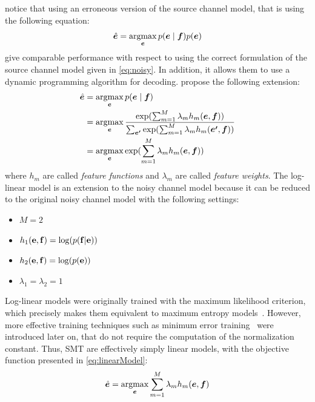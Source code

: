 
\citet{och-tillmann-ney:1999:EMNLP} notice that using an erroneous
version of the source channel model, that is using the following equation:
%
\begin{equation}
  \hat{\bm{e}} = \operatorname*{argmax}_{\bm{e}} p(\bm{e} \mid \bm{f}) p(\bm{e})
\end{equation}
%
give comparable performance with respect to using the correct
formulation of the source channel model given in \autoref{eq:noisy}. In addition, it
allows them to use a dynamic programming algorithm for decoding.
\citet{och-ney:2002:ACL} propose the following extension:
%
\begin{align}
  \hat{\bm{e}} &= \operatorname*{argmax}_{\bm{e}} p(\bm{e} \mid \bm{f}) \nonumber \\
               &= \operatorname*{argmax}_{\bm{e}} \frac{\exp(\sum_{m=1}^M \lambda_m h_m(\bm{e}, \bm{f}))}{\sum_{\bm{e'}}\exp(\sum_{m=1}^M \lambda_m h_m(\bm{e'}, \bm{f}))} \nonumber \\
               &= \operatorname*{argmax}_{\bm{e}} \exp(\sum_{m=1}^M \lambda_m h_m(\bm{e}, \bm{f})) \label{eq:loglinearModel}
\end{align}
%
where $h_m$ are called \emph{feature functions} and $\lambda_m$
are called \emph{feature weights}. The log-linear model is an extension
to the noisy channel model because it can be reduced to the original
noisy channel model with the following settings:
%
    \begin{itemize}
      \item $M = 2$
      \item $h_1({\bf e}, {\bf f}) = \log (p({\bf f}|{\bf e}))$
      \item $h_2({\bf e}, {\bf f}) = \log (p({\bf e}))$
      \item $\lambda_1 = \lambda_2 = 1$
    \end{itemize}
%
Log-linear models were originally trained with the maximum likelihood
criterion, which precisely makes them equivalent to maximum entropy
models~\citep{berger-dellapietra-dellapietra:1996:CL}. However,
more effective training techniques such as minimum error
training~\citep{och:2003:ACL} were introduced later on, that do
not require the computation of the normalization constant.
Thus, SMT are effectively simply linear models, with the objective
function presented in \autoref{eq:linearModel}:
%
\begin{equation}
  \hat{\bm{e}} = \operatorname*{argmax}_{\bm{e}} \sum_{m=1}^M \lambda_m h_m(\bm{e}, \bm{f})
  \label{eq:linearModel}
\end{equation}

